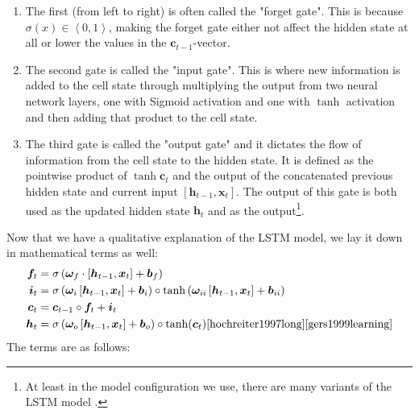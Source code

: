 \begin{enumerate}
    \item The first (from left to right) is often called the "forget gate". This is because $\sigma(x) \in \left<0,1\right>$, making the forget gate either not affect the hidden state at all or lower the values in the $\bm{c}_{t-1}$-vector.
    \item The second gate is called the "input gate". This is where new information is added to the cell state through multiplying the output from two neural network layers, one with Sigmoid activation and one with $\tanh$ activation and then adding that product to the cell state.
    \item The third gate is called the "output gate" and it dictates the flow of information from the cell state to the hidden state. It is defined as the pointwise product of $\tanh{\bm{c}_t}$ and the output of the concatenated previous hidden state and current input $\left[\bm{h}_{t-1},\bm{x}_t\right]$. The output of this gate is both used as the updated hidden state $\bm{h}_t$ and as the output\footnote{At least in the model configuration we use, there are many variants of the LSTM model \cite{graves2012long}.}.
\end{enumerate}
Now that we have a qualitative explanation of the LSTM model, we lay it down in 
mathematical terms as well:
\begin{align}
    \bm{f}_t &= \sigma\left(\bm{\omega}_f\cdot \left[\bm{h}_{t-1},\bm{x}_t\right]+\bm{b}_f\right) \label{forget gate}\\
    \bm{i}_t &= \sigma\left(\bm{\omega}_i \left[ \bm{h}_{t-1}, \bm{x}_t\right] + \bm{b}_i\right) \circ \tanh\left(\bm{\omega}_{ii}\left[ \bm{h}_{t-1},\bm{x}_t  \right] + \bm{b}_{ii}\right) \label{input gate}\\
    \bm{c}_t &= \bm{c}_{t-1} \circ \bm{f}_t + \bm{i}_t \\
    \bm{h}_t &= \sigma \left( \bm{\omega}_o \left[ \bm{h}_{t-1}, \bm{x}_t \right] 
    + \bm{b}_o \right) \circ \tanh(\bm{c}_t) \label{output gate}
    \cite{hochreiter1997long} \cite{gers1999learning}
\end{align}
The terms are as follows:
